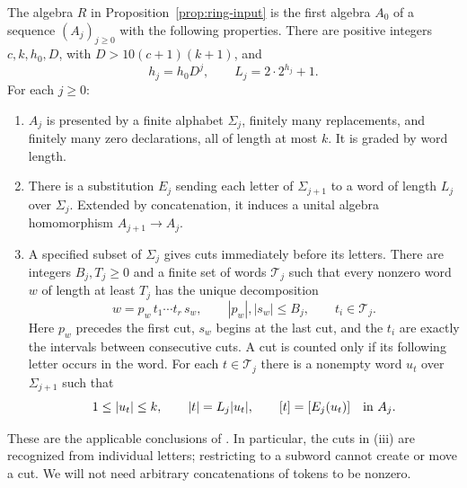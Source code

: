 \begin{proposition}\label{prop:hierarchy-input}
The algebra $R$ in Proposition~\ref{prop:ring-input} is the first
algebra $A_0$ of a sequence $(A_j)_{j\geq0}$ with the following
properties.  There are positive integers $c,k,h_0,D$, with
$D>10(c+1)(k+1)$, and
\[
 h_j=h_0D^j,\qquad L_j=2\cdot2^{h_j}+1.
\]
For each $j\geq0$:
\begin{enumerate}[label=\textup{(\roman*)},leftmargin=*]
\item
$A_j$ is presented by a finite alphabet $\Sigma_j$, finitely many
replacements, and finitely many zero declarations, all of length at
most $k$.  It is graded by word length.
\item
There is a substitution $E_j$ sending each letter of $\Sigma_{j+1}$
to a word of length $L_j$ over $\Sigma_j$.  Extended by concatenation,
it induces a unital algebra homomorphism $A_{j+1}\to A_j$.
\item
A specified subset of $\Sigma_j$ gives cuts immediately before its
letters.  There are integers $B_j,T_j\geq0$ and a finite set of words
$\mathcal T_j$ such that every nonzero word $w$ of length at least
$T_j$ has the unique decomposition
\begin{equation}\label{eq:token-decomposition}
 w=p_w\,t_1\cdots t_r\,s_w,
 \qquad |p_w|,|s_w|\leq B_j,\qquad t_i\in\mathcal T_j.
\end{equation}
Here $p_w$ precedes the first cut, $s_w$ begins at the last cut, and
the $t_i$ are exactly the intervals between consecutive cuts.  A cut
is counted only if its following letter occurs in the word.
For each $t\in\mathcal T_j$ there is a nonempty word $u_t$ over
$\Sigma_{j+1}$ such that
\begin{equation}\label{eq:token-upper-word}
 1\leq |u_t|\leq k,\qquad
 |t|=L_j|u_t|,\qquad [t]=[E_j(u_t)]\quad\hbox{in }A_j.
\end{equation}
\end{enumerate}
\end{proposition}

These are the applicable conclusions of
\cite[Proposition~2.2 and the choice of parameters in Section~3]{Companion}.
In particular, the cuts in (iii) are recognized from individual
letters; restricting to a subword cannot create or move a cut.  We
will not need arbitrary concatenations of tokens to be nonzero.

